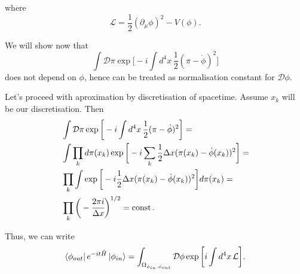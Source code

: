 \documentclass[main.tex]{subfiles}
\begin{document}
where
\begin{equation}
\mathcal{L} = \frac{1}{2}(\partial_\mu \phi)^2 - V(\phi).
\end{equation}

We will show now that 
\begin{equation}
\int \mathcal{D}\pi
\exp\bigg[-i \int d^4 x\, \frac{1}{2}(\pi - \dot{\phi})^2 \bigg]
\end{equation}
does not depend on $\phi$, hence can be treated as normalisation constant for $\mathcal{D}\phi$.

Let's proceed with aproximation by discretisation of spacetime. Assume $x_k$ will be our discretisation. Then
\begin{align*}
& \int \mathcal{D}\pi
\exp\bigg[-i \int d^4 x\, \frac{1}{2}(\pi - \dot{\phi})^2 \bigg] = \\
& \int \prod_k d\pi(x_k)
\exp\bigg[-i \sum_k \frac{1}{2}\Delta x(\pi(x_k) - \dot{\phi}(x_k))^2 \bigg] = \\
& \prod_k \int \exp\bigg[-i \frac{1}{2}\Delta x(\pi(x_k) - \dot{\phi}(x_k))^2 \bigg] d\pi(x_k) = \\
& \prod_k \bigg( - \cfrac{2\pi i }{\Delta x}\bigg)^{1/2} = \operatorname{const}. 
\end{align*}

Thus, we can write
\begin{equation}
\bra{\phi_{out}} e^{-it\hat{H}} \ket{\phi_{in}} = \int_{\Omega_{\phi_{in}, \phi_{out}}} \mathcal{D}\phi
\exp\bigg[i \int d^4 x\, \mathcal{L} \bigg].
\end{equation}
\end{document}
